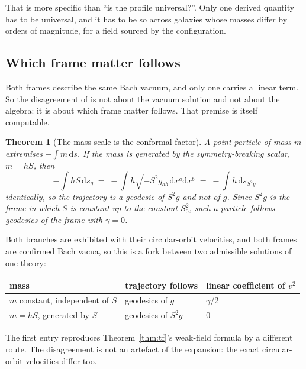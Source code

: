 \documentclass[11pt]{article}
\newtheorem{theorem}{Theorem}[section]
\theoremstyle{definition}
\theoremstyle{remark}
\newcommand{\dd}{\mathrm d}
\begin{document}
That is more specific than ``is the profile universal?''.  Only one derived
quantity has to be universal, and it has to be so across galaxies whose
masses differ by orders of magnitude, for a field sourced by the
configuration.

\subsection*{Which frame matter follows}

Both frames describe the same Bach vacuum, and only one carries a linear
term.  So the disagreement of \cite{Flanagan2006,Mannheim2006} is not about
the vacuum solution and not about the algebra: it is about which frame matter
follows.  That premise is itself computable.

\begin{theorem}[The mass scale is the conformal factor]
\label{thm:frame}
A point particle of mass \(m\) extremises \(-\!\int m\,\dd s\).  If the mass
is generated by the symmetry-breaking scalar, \(m=hS\), then
\[
  -\!\int hS\,\dd s_{g}
  \;=\;-\!\int h\sqrt{-S^{2}g_{ab}\,\dd x^{a}\dd x^{b}}
  \;=\;-\!\int h\,\dd s_{S^{2}g}
\]
identically, so the trajectory is a geodesic of \(S^{2}g\) and not of \(g\).
Since \(S^{2}g\) is the frame in which \(S\) is constant up to the constant
\(S_{0}^{2}\), such a particle follows geodesics of the frame with
\(\gamma=0\).
\end{theorem}

Both branches are exhibited with their circular-orbit velocities, and both
frames are confirmed Bach vacua, so this is a fork between two admissible
solutions of one theory:

\begin{center}
\begin{tabularx}{\textwidth}{@{}lYY@{}}
\toprule
mass & trajectory follows & linear coefficient of \(v^{2}\) \\
\midrule
\(m\) constant, independent of \(S\) & geodesics of \(g\) & \(\gamma/2\) \\
\(m=hS\), generated by \(S\) & geodesics of \(S^{2}g\) & \(0\) \\
\bottomrule
\end{tabularx}
\end{center}

The first entry reproduces Theorem~\ref{thm:tf}'s weak-field formula by a
different route.  The disagreement is not an artefact of the expansion: the
exact circular-orbit velocities differ too.
\end{document}
